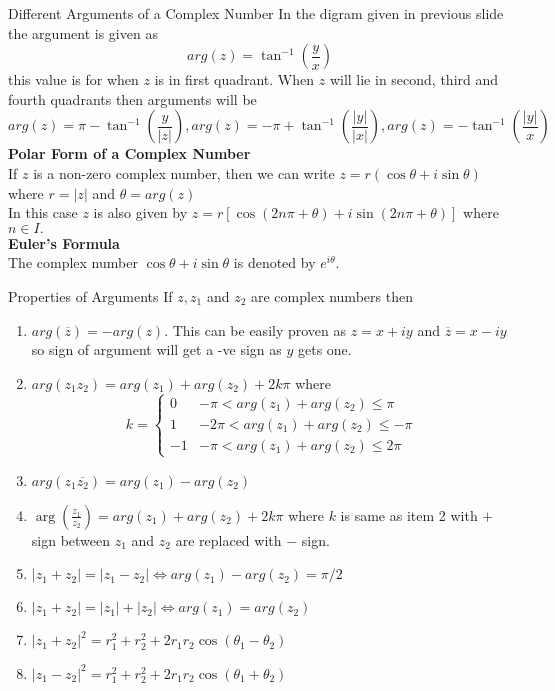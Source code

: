 \documentclass[aspectratio=169,8pt]{beamer}
\begin{document}
\begin{frame}{Different Arguments of a Complex Number}
  In the digram given in previous slide the argument is given as
  $$arg(z) = \tan^{-1}\left(\frac{y}{x}\right)$$
  this value is for when $z$ is in first quadrant. When $z$ will lie in second,
  third and fourth quadrants then arguments will be
  $$arg(z) = \pi - \tan^{-1}\left(\frac{y}{|z|}\right), arg(z) = -\pi +
  \tan^{-1}\left(\frac{|y|}{|x|}\right), arg(z) =
  -\tan^{-1}\left(\frac{|y|}{x}\right)$$
  \vspace*{0.2cm}
  \textbf{\large{Polar Form of a Complex Number}}\\
  \vspace*{0.2cm}
  If $z$ is a non-zero complex number, then we can write $z = r(\cos\theta +
  i\sin\theta)$ where $r = |z|$ and $\theta = arg(z)$\\
  \vspace*{0.2cm}
  In this case $z$ is also given by $z = r[\cos(2n\pi + \theta) + i\sin(2n\pi +
    \theta)]$ where $n\in I.$\\
  \vspace*{0.2cm}
  \textbf{\large{Euler's Formula}}\\
  The complex number $\cos\theta + i\sin\theta$ is denoted by $e^{i\theta}$.
\end{frame}
\begin{frame}{Properties of Arguments}
  If $z, z_1$ and $z_2$ are complex numbers then
  \begin{enumerate}
    \item $arg(\overline{z}) = -arg(z)$. This can be easily proven as $z = x +
      iy$ and $\overline{z} = x - iy$ so sign of argument will get a -ve sign
      as $y$ gets one.
    \item $arg(z_1z_2) = arg(z_1) + arg(z_2) + 2k\pi$ where
      $$k = \begin{cases}0 & -\pi <arg(z_1) + arg(z_2) \leq \pi\\
      1 & -2\pi < arg(z_1) + arg(z_2)\leq -\pi\\
      -1 & -\pi < arg(z_1) + arg(z_2)\leq 2\pi\end{cases}$$
    \item $arg(z_1\overline{z_2}) = arg(z_1) - arg(z_2)$
    \item $\arg\left(\frac{z_1}{z_2}\right) = arg(z_1) + arg(z_2) + 2k\pi$
      where $k$ is same as item 2 with $+$ sign between $z_1$ and $z_2$ are
      replaced with $-$ sign.
    \item $|z_1 + z_2| = |z_1 - z_2|\Leftrightarrow arg(z_1) - arg(z_2) =
      \pi/2$
    \item $|z_1 + z_2| = |z_1| + |z_2|\Leftrightarrow arg(z_1) = arg(z_2)$
    \item $|z_1 + z_2|^2 = r_1^2 + r_2^2 + 2r_1r_2\cos(\theta_1 - \theta_2)$
    \item $|z_1 - z_2|^2 = r_1^2 + r_2^2 + 2r_1r_2\cos(\theta_1 + \theta_2)$
  \end{enumerate}
\end{frame}
\end{document}
